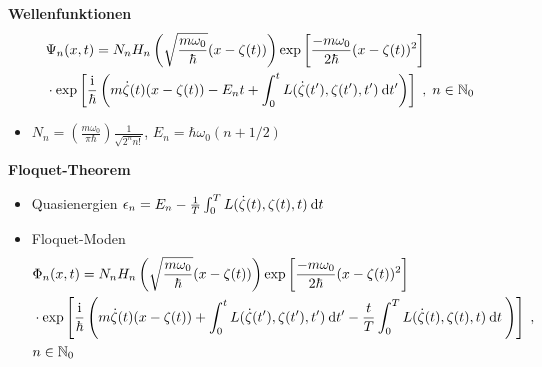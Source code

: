 \begin{frame}
  \textbf{Wellenfunktionen}
  \begin{align}
    &\Psi_n(x,t) = N_nH_n\left(\sqrt{\frac{m\omega_0}{\hbar}}(x-\zeta(t))\right) \exp\left[\frac{-m\omega_0}{2\hbar}(x-\zeta(t))^2\right] \notag\\
    & \cdot \exp\left[\frac{\text i}{\hbar}\left(m\dot \zeta(t)(x-\zeta(t))-E_nt+\int_0^tL(\dot \zeta(t'),\zeta(t'),t')\:\text dt'\right)\right] \; ,
    \; n \in \mathbb{N}_0
  \end{align}
  \begin{itemize}
    \item $N_n = \left(\frac{m\omega_0}{\pi \hbar}\right) \frac{1}{\sqrt{2^nn!}}$,
     $E_n = \hbar \omega_0(n+1/2)$ %
  \end{itemize}

  \textbf{Floquet-Theorem}
  \begin{itemize}
    \item Quasienergien $\epsilon_n = E_n - \frac{1}{T} \int_0^T L(\dot \zeta(t), \zeta(t), t) \: \text d t$
    \item Floquet-Moden
    \begin{align}
        &\Phi_n(x,t) =
         N_nH_n\left(\sqrt{\frac{m\omega_0}{\hbar}}(x-\zeta(t))\right) \exp\left[\frac{-m\omega_0}{2\hbar}(x-\zeta(t))^2\right] \notag\\
        & \cdot \exp\left[\frac{\text i}{\hbar}\left(m\dot \zeta(t)(x-\zeta(t))+\int_0^tL(\dot \zeta(t'),\zeta(t'),t')\:\text d t'-\frac{t}{T} \int_0^T L(\dot \zeta(t),\zeta(t),t)\:\text dt\: \right)\right] \; ,\notag\\
        & n \in \mathbb{N}_0
    \end{align}
  \end{itemize}
\end{frame}



